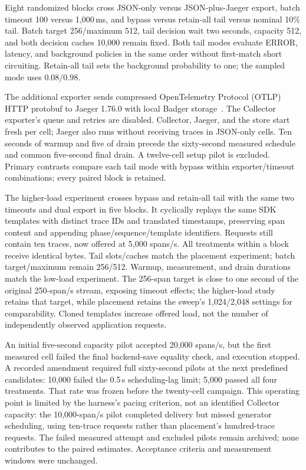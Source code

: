 Eight randomized blocks cross JSON-only versus JSON-plus-Jaeger export, batch timeout 100 versus 1,000\,ms, and bypass versus retain-all tail versus nominal 10\% tail. Batch target 256/maximum 512, tail decision wait two seconds, capacity 512, and both decision caches 10,000 remain fixed. Both tail modes evaluate ERROR, latency, and background policies in the same order without first-match short circuiting. Retain-all tail sets the background probability to one; the sampled mode uses $0.08/0.98$.

The additional exporter sends compressed OpenTelemetry Protocol (OTLP) HTTP protobuf to Jaeger 1.76.0 with local Badger storage~\cite{jaegerDeployment176,jaegerCli176,otelOtlpHttp0136}. The Collector exporter's queue and retries are disabled. Collector, Jaeger, and the store start fresh per cell; Jaeger also runs without receiving traces in JSON-only cells. Ten seconds of warmup and five of drain precede the sixty-second measured schedule and common five-second final drain. A twelve-cell setup pilot is excluded. Primary contrasts compare each tail mode with bypass within exporter/timeout combinations; every paired block is retained.

The higher-load experiment crosses bypass and retain-all tail with the same two timeouts and dual export in five blocks. It cyclically replays the same SDK templates with distinct trace IDs and translated timestamps, preserving span content and appending phase/sequence/template identifiers. Requests still contain ten traces, now offered at 5,000 spans/s. All treatments within a block receive identical bytes. Tail slots/caches match the placement experiment; batch target/maximum remain 256/512. Warmup, measurement, and drain durations match the low-load experiment. The 256-span target is close to one second of the original 250-span/s stream, exposing timeout effects; the higher-load study retains that target, while placement retains the sweep's 1,024/2,048 settings for comparability. Cloned templates increase offered load, not the number of independently observed application requests.

An initial five-second capacity pilot accepted 20,000 spans/s, but the first measured cell failed the final backend-save equality check, and execution stopped. A recorded amendment required full sixty-second pilots at the next predefined candidates: 10,000 failed the 0.5\,s scheduling-lag limit; 5,000 passed all four treatments. That rate was frozen before the twenty-cell campaign. This operating point is limited by the harness's pacing criterion, not an identified Collector capacity: the 10,000-span/s pilot completed delivery but missed generator scheduling, using ten-trace requests rather than placement's hundred-trace requests. The failed measured attempt and excluded pilots remain archived; none contributes to the paired estimates. Acceptance criteria and measurement windows were unchanged.

